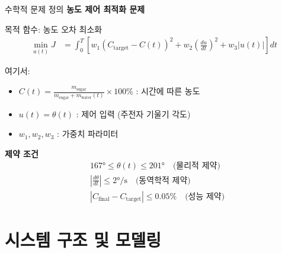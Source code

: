 \documentclass[aspectratio=169]{beamer}
\begin{document}
\begin{frame}{수학적 문제 정의}
    \textbf{농도 제어 최적화 문제}
    
    목적 함수: 농도 오차 최소화
    \begin{align}
        \min_{u(t)} J &= \int_0^T \left[ w_1(C_{\text{target}} - C(t))^2 + w_2 \left(\frac{du}{dt}\right)^2 + w_3|u(t)| \right] dt
    \end{align}
    
    여기서:
    \begin{itemize}
        \item $C(t) = \frac{m_{\text{sugar}}}{m_{\text{sugar}} + m_{\text{water}}(t)} \times 100\%$ : 시간에 따른 농도
        \item $u(t) = \theta(t)$ : 제어 입력 (주전자 기울기 각도)
        \item $w_1, w_2, w_3$ : 가중치 파라미터
    \end{itemize}
    
    \textbf{제약 조건}
    \begin{align}
        &167° \leq \theta(t) \leq 201° \quad \text{(물리적 제약)} \\
        &\left|\frac{d\theta}{dt}\right| \leq 2°/\text{s} \quad \text{(동역학적 제약)} \\
        &|C_{\text{final}} - C_{\text{target}}| \leq 0.05\% \quad \text{(성능 제약)}
    \end{align}
\end{frame}

\section{시스템 구조 및 모델링}
\end{document}
